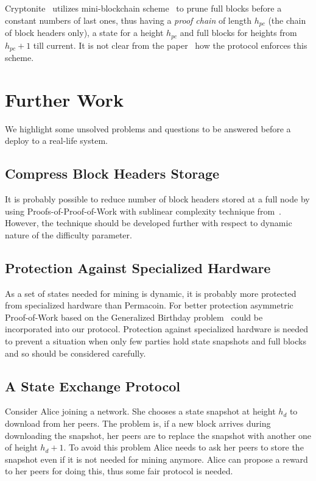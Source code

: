 \documentclass[conference,compsoc]{IEEEtran}
\begin{document}
Cryptonite~\cite{cryptonite} utilizes mini-blockchain scheme~\cite{minibc} to prune full blocks before a constant numbers of last ones, thus having a \textit{proof chain} of length \(h_{pc}\) (the chain of block headers only), a state for a height \(h_{pc}\) and full blocks for heights from \(h_{pc}+1\) till current. It is not clear from the paper~\cite{minibc} how the protocol enforces this scheme.



\section{Further Work}

We highlight some unsolved problems and questions to be answered before a deploy to a real-life system.

\subsection{Compress Block Headers Storage}

It is probably possible to reduce number of block headers stored at a full node by using Proofs-of-Proof-of-Work with sublinear complexity technique from~\cite{kiayiasproofs}. However, the technique should be developed further with respect to dynamic nature of the difficulty parameter.


\subsection{Protection Against Specialized Hardware}

As a set of states needed for mining is dynamic, it is probably more protected from specialized hardware than Permacoin. For better protection asymmetric Proof-of-Work based on the Generalized Birthday problem~\cite{biryukov2016asymmetric} could be incorporated into our protocol. Protection against specialized hardware is needed to prevent a situation when only few parties hold state snapshots and full blocks and so should be considered carefully.


\subsection{A State Exchange Protocol}

Consider Alice joining a network. She chooses a state snapshot at height \(h_d\) to download from her peers. The problem is, if a new block arrives during downloading the snapshot, her peers are to replace the snapshot with another one of height \(h_d+1\). To avoid this problem Alice needs to ask her peers to store the snapshot even if it is not needed for mining anymore. Alice can propose a reward to her peers for doing this, thus some fair protocol is needed.
\end{document}
